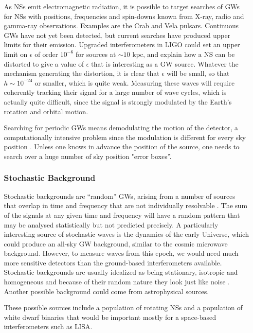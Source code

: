 \documentclass[binding=0.6cm, LaM]{sapthesis}
\begin{document}
	As NSs emit electromagnetic radiation, 
	it is possible to target searches of GWs for NSs with positions, 
	frequencies and spin-downs known from X-ray, radio and gamma-ray observations. 
	Examples are the Crab and Vela pulsars. 
	Continuous GWs have not yet been detected, 
	but current searches have produced upper limits for their emission. 
	Upgraded interferometers in LIGO could set an upper limit on  
	$\epsilon$ of order $10^{-6}$ for sources at $\sim10$ kpc, 
	and explain how a NS can be distorted to give a value of $\epsilon$ that is interesting as a GW source. 
	Whatever the mechanism generating the distortion, 
	it is clear that  $\epsilon$ will be small,
	so that $h \sim 10^{-24}$ or smaller, which is quite weak. 
	Measuring these waves will require
	coherently tracking their signal for a large number of wave cycles, 
	which is actually quite difficult, 
	since the signal is strongly modulated by the Earth’s rotation and orbital motion.

	Searching for periodic GWs means demodulating the motion of the detector, 
	a computationally intensive problem since the modulation is different for every sky position \cite{4}. 
	Unless one knows in advance the position of the source, 
	one needs to search over a huge number of sky position "error boxes”.

\subsubsection{Stochastic Background}
	Stochastic backgrounds are “random” GWs, 
	arising from a  number of sources that overlap 
	in time and frequency that are not individually resolvable \cite{22}. 
	The sum of the signals at any given time and frequency will have 
	a random pattern that may be analysed statistically but not predicted precisely.
	A particularly interesting source of stochastic waves is the dynamics of the early Universe, 
	which could produce an all-sky GW background, 
	similar to the cosmic microwave background.
	However, to measure waves from this epoch, 
	we would need much more sensitive detectors than the ground-based interferometers available.
	Stochastic backgrounds are usually idealized as being stationary, 
	isotropic and homogeneous and because of their random nature they look just like noise \cite{4}.	
	Another possible background could come from astrophysical sources.

	These possible sources include a population of rotating NSs 
	and a population of white dwarf binaries that would be important mostly for a space-based interferometers such as LISA. 
\end{document}

